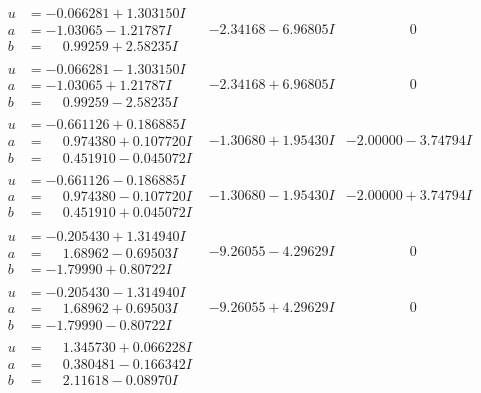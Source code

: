 \documentclass[1p]{elsarticle_modified}
\theoremstyle{definition}
\begin{document}
$$\begin{array}{c|c|c}
 \hline 
\begin{aligned}
u &= -0.066281 + 1.303150 I \\
a &= -1.03065 - 1.21787 I \\
b &= \phantom{-}0.99259 + 2.58235 I\end{aligned}
 & -2.34168 - 6.96805 I & \phantom{-0.000000 } 0 \\ \hline\begin{aligned}
u &= -0.066281 - 1.303150 I \\
a &= -1.03065 + 1.21787 I \\
b &= \phantom{-}0.99259 - 2.58235 I\end{aligned}
 & -2.34168 + 6.96805 I & \phantom{-0.000000 } 0 \\ \hline\begin{aligned}
u &= -0.661126 + 0.186885 I \\
a &= \phantom{-}0.974380 + 0.107720 I \\
b &= \phantom{-}0.451910 - 0.045072 I\end{aligned}
 & -1.30680 + 1.95430 I & -2.00000 - 3.74794 I \\ \hline\begin{aligned}
u &= -0.661126 - 0.186885 I \\
a &= \phantom{-}0.974380 - 0.107720 I \\
b &= \phantom{-}0.451910 + 0.045072 I\end{aligned}
 & -1.30680 - 1.95430 I & -2.00000 + 3.74794 I \\ \hline\begin{aligned}
u &= -0.205430 + 1.314940 I \\
a &= \phantom{-}1.68962 - 0.69503 I \\
b &= -1.79990 + 0.80722 I\end{aligned}
 & -9.26055 - 4.29629 I & \phantom{-0.000000 } 0 \\ \hline\begin{aligned}
u &= -0.205430 - 1.314940 I \\
a &= \phantom{-}1.68962 + 0.69503 I \\
b &= -1.79990 - 0.80722 I\end{aligned}
 & -9.26055 + 4.29629 I & \phantom{-0.000000 } 0 \\ \hline\begin{aligned}
u &= \phantom{-}1.345730 + 0.066228 I \\
a &= \phantom{-}0.380481 - 0.166342 I \\
b &= \phantom{-}2.11618 - 0.08970 I\end{aligned}

\end{array}$$
\end{document}
